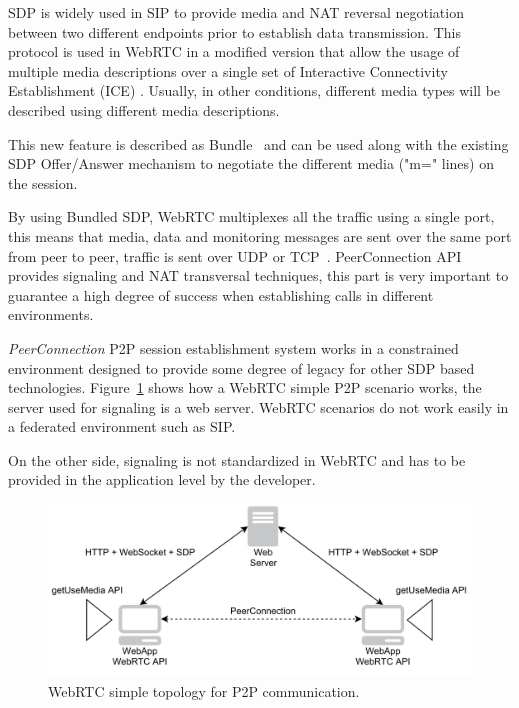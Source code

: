 SDP is widely used in SIP to provide media and NAT reversal negotiation between two different endpoints prior to establish data transmission. This protocol is used in WebRTC in a modified version that allow the usage of multiple media descriptions over a single set of Interactive Connectivity Establishment (ICE) . Usually, in other conditions, different media types will be described using different media descriptions.

This new feature is described as Bundle~\cite{SDPBUNDLE} and can be used along with the existing SDP Offer/Answer mechanism to negotiate the different media ("m=" lines) on the session.

By using Bundled SDP, WebRTC multiplexes all the traffic using a single port, this means that media, data and monitoring messages are sent over the same port from peer to peer, traffic is sent over UDP or TCP~\cite{alvestrandOverview2012}. PeerConnection API provides signaling and NAT transversal techniques, this part is very important to guarantee a high degree of success when establishing calls in different environments.

{\it PeerConnection} P2P session establishment system works in a constrained environment designed to provide some degree of legacy for other SDP based technologies. Figure~\ref{fig:webrtcExample} shows how a WebRTC simple P2P scenario works, the server used for signaling is a web server. WebRTC scenarios do not work easily in a federated environment such as SIP.

On the other side, signaling is not standardized in WebRTC and has to be provided in the application level by the developer.

 \begin{figure}[h]
  \centering
    \includegraphics[width=1\textwidth]{./figures/webrtcExample.pdf}
      \caption[WebRTC simple topology for P2P communication]{WebRTC simple topology for P2P communication.}
	\label{fig:webrtcExample}
\end{figure}

